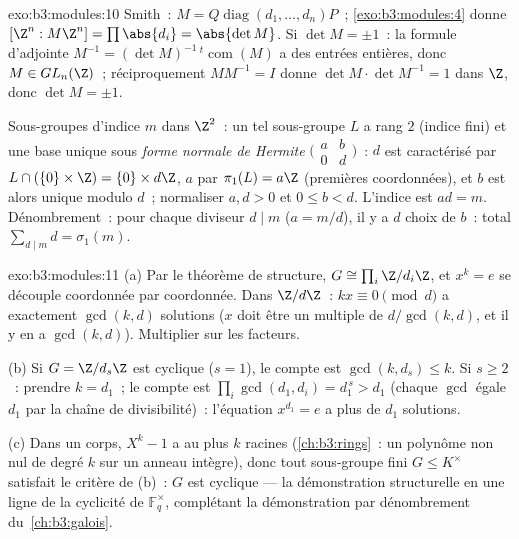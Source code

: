 \begin{solution}{exo:b3:modules:10}
Smith~: $M = Q\operatorname{diag}(d_1,\dots,d_n)P$~;
\cref{exo:b3:modules:4} donne $[\Z^n : M\Z^n] = \prod\abs{d_i}
= \abs{\det M}$. Si $\det M = \pm 1$~: la formule d'adjointe
$M^{-1} = (\det M)^{-1}\,{}^{t}\!\operatorname{com}(M)$ a des
entrées entières, donc $M \in GL_n(\Z)$~; réciproquement $MM^{-1}
= I$ donne $\det M \cdot \det M^{-1} = 1$ dans $\Z$, donc $\det M
= \pm1$.

Sous-groupes d'indice $m$ dans $\Z^2$~: un tel sous-groupe $L$ a
rang $2$ (indice fini) et une base unique sous \emph{forme
normale de Hermite} $\bigl(\begin{smallmatrix} a & b\\ 0 &
d\end{smallmatrix}\bigr)$~: $d$ est caractérisé par $L \cap
(\{0\} \times \Z) = \{0\} \times d\Z$, $a$ par $\pi_1(L) = a\Z$
(premières coordonnées), et $b$ est alors unique modulo $d$~;
normaliser $a, d > 0$ et $0 \leq b < d$. L'indice est $ad = m$.
Dénombrement~: pour chaque diviseur $d \mid m$ ($a = m/d$), il y
a $d$ choix de $b$~: total $\sum_{d \mid m} d = \sigma_1(m)$.
\end{solution}

\begin{solution}{exo:b3:modules:11}
(a) Par le théorème de structure, $G \cong \prod_i\Z/d_i\Z$, et
$x^k = e$ se découple coordonnée par coordonnée. Dans $\Z/d\Z$~:
$kx \equiv 0 \pmod d$ a exactement $\gcd(k, d)$ solutions ($x$
doit être un multiple de $d/\gcd(k,d)$, et il y en a $\gcd(k, d)$).
Multiplier sur les facteurs.

(b) Si $G = \Z/d_s\Z$ est cyclique ($s = 1$), le compte est
$\gcd(k, d_s) \leq k$. Si $s \geq 2$~: prendre $k = d_1$~; le
compte est $\prod_i\gcd(d_1, d_i) = d_1^{\,s} > d_1$ (chaque
$\gcd$ égale $d_1$ par la chaîne de divisibilité)~: l'équation
$x^{d_1} = e$ a plus de $d_1$ solutions.

(c) Dans un corps, $X^k - 1$ a au plus $k$ racines
(\cref{ch:b3:rings}~: un polynôme non nul de degré $k$ sur un
anneau intègre), donc tout sous-groupe fini $G \leq K^\times$
satisfait le critère de (b)~: $G$ est cyclique --- la
démonstration structurelle en une ligne de la cyclicité de
$\mathbb F_q^\times$, complétant la démonstration par
dénombrement du~\cref{ch:b3:galois}.
\end{solution}


